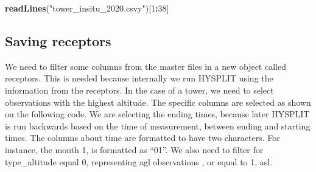 \documentclass[preprint, 3p,
authoryear]{elsarticle} %
\newenvironment{Shaded}{\begin{snugshade}}{\end{snugshade}}
\newcommand{\DecValTok}[1]{\textcolor[rgb]{0.00,0.00,0.81}{#1}}
\newcommand{\FunctionTok}[1]{\textcolor[rgb]{0.13,0.29,0.53}{\textbf{#1}}}
\newcommand{\NormalTok}[1]{#1}
\newcommand{\SpecialCharTok}[1]{\textcolor[rgb]{0.81,0.36,0.00}{\textbf{#1}}}
\newcommand{\StringTok}[1]{\textcolor[rgb]{0.31,0.60,0.02}{#1}}
\begin{document}
\begin{Shaded}
\begin{Highlighting}[]
\FunctionTok{readLines}\NormalTok{(}\StringTok{"tower\_insitu\_2020.csvy"}\NormalTok{)[}\DecValTok{1}\SpecialCharTok{:}\DecValTok{38}\NormalTok{]}
\end{Highlighting}
\end{Shaded}

\hypertarget{saving-receptors}{%
\subsection{Saving receptors}\label{saving-receptors}}

We need to filter some columns from the master files in a new object
called receptors. This is needed because internally we run HYSPLIT
\citep{hy} using the information from the receptors. In the case of a
tower, we need to select observations with the highest altitude. The
specific columns are selected as shown on the following code. We are
selecting the ending times, because later HYSPLIT is run backwards based
on the time of measurement, between ending and starting times. The
columns about time are formatted to have two characters. For instance,
the month 1, is formatted as ``01''. We also need to filter for
type\_altitude equal 0, representing agl observations , or equal to 1,
asl.
\end{document}
